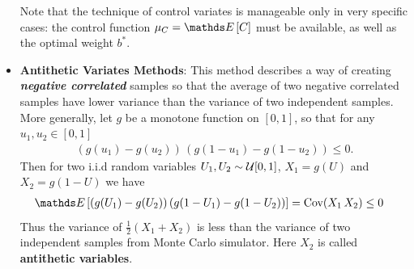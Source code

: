 \documentclass[11pt]{article}
\begin{document}
\begin{itemize}
Note that the technique of control variates is manageable only in very specific cases: the control function $\mu_{C} = \E{}{C}$ must be available, as well as the optimal weight $b^{*}$.


\item \textbf{Antithetic Variates Methods}: This method describes a way of creating \emph{\textbf{negative correlated}} samples so that the average of two negative correlated samples have lower variance than the variance of two independent samples. More generally, let $g$ be a monotone function on $[0,1]$, so that for any $u_1, u_2 \in [0,1]$
\begin{align*}
(g(u_1) - g(u_2))\,(g(1-u_1) - g(1- u_2)) \le 0. 
\end{align*} Then for two i.i.d random variables $U_1, U_2 \sim {\mathcal U}[0,1]$, $X_1 = g(U)$ and $X_2 = g(1- U)$ we have
\begin{align*}
\E{}{(g(U_1) - g(U_2))\,(g(1-U_1) - g(1- U_2))} &= \text{Cov}(X_1\, X_2) \le 0
\end{align*} Thus the variance of $\frac{1}{2}(X_1 + X_2)$ is less than the variance of two independent samples from Monte Carlo simulator. Here $X_2$ is called \textbf{antithetic variables}.
\end{itemize}
\end{document}
